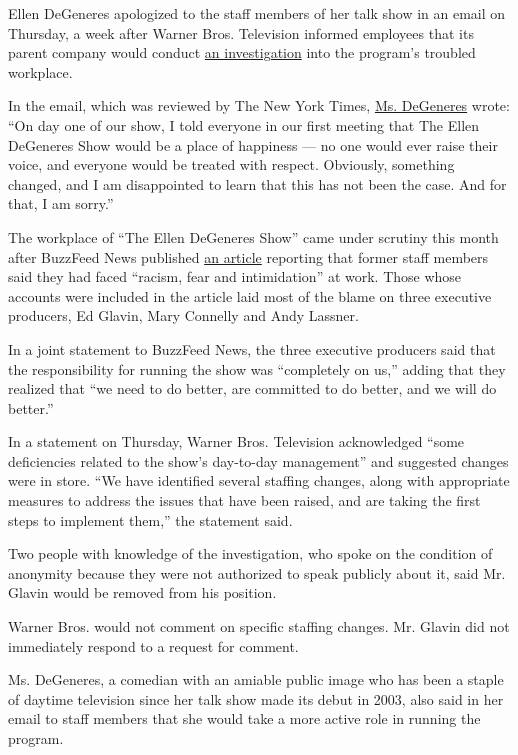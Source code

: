 Ellen DeGeneres apologized to the staff members of her talk show in an
email on Thursday, a week after Warner Bros. Television informed
employees that its parent company would conduct
\href{https://www.nytimes3xbfgragh.onion/2020/07/27/business/media/ellen-degeneres-show-investigation.html}{an
investigation} into the program's troubled workplace.

In the email, which was reviewed by The New York Times,
\href{https://www.nytimes3xbfgragh.onion/2018/12/12/arts/television/ellen-degeneres.html}{Ms.
DeGeneres} wrote: ``On day one of our show, I told everyone in our first
meeting that The Ellen DeGeneres Show would be a place of happiness ---
no one would ever raise their voice, and everyone would be treated with
respect. Obviously, something changed, and I am disappointed to learn
that this has not been the case. And for that, I am sorry.''

The workplace of ``The Ellen DeGeneres Show'' came under scrutiny this
month after BuzzFeed News published
\href{https://www.buzzfeednews.com/article/krystieyandoli/ellen-employees-allege-toxic-workplace-culture}{an
article} reporting that former staff members said they had faced
``racism, fear and intimidation'' at work. Those whose accounts were
included in the article laid most of the blame on three executive
producers, Ed Glavin, Mary Connelly and Andy Lassner.

In a joint statement to BuzzFeed News, the three executive producers
said that the responsibility for running the show was ``completely on
us,'' adding that they realized that ``we need to do better, are
committed to do better, and we will do better.''

In a statement on Thursday, Warner Bros. Television acknowledged ``some
deficiencies related to the show's day-to-day management'' and suggested
changes were in store. ``We have identified several staffing changes,
along with appropriate measures to address the issues that have been
raised, and are taking the first steps to implement them,'' the
statement said.

Two people with knowledge of the investigation, who spoke on the
condition of anonymity because they were not authorized to speak
publicly about it, said Mr. Glavin would be removed from his position.

Warner Bros. would not comment on specific staffing changes. Mr. Glavin
did not immediately respond to a request for comment.

Ms. DeGeneres, a comedian with an amiable public image who has been a
staple of daytime television since her talk show made its debut in 2003,
also said in her email to staff members that she would take a more
active role in running the program.

